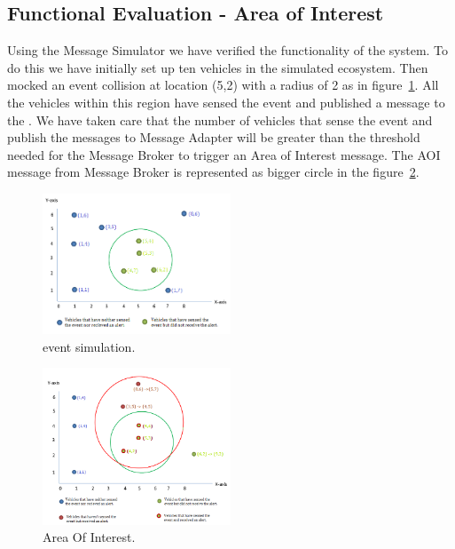 \subsection{Functional Evaluation - Area of Interest}
Using the Message Simulator we have verified the functionality of the
system.  To do this we have initially set up ten vehicles in the
simulated ecosystem.  Then mocked an event collision at location (5,2)
with a radius of 2 as in figure~\ref{fig:simulated}. All the vehicles
within this region have sensed the event and published a message to
the \name. We have taken care that the number of vehicles that sense
the event and publish the messages to Message Adapter will be greater
than the threshold needed for the Message Broker to trigger an Area of
Interest message. The AOI message from Message Broker is represented
as bigger circle in the figure~\ref{fig:aoi}.

\begin{figure}[ht]
  \begin{center}
    \includegraphics[width=0.5\textwidth]{figs/simulated.png}
    \caption{\name{} event simulation.}
    \label{fig:simulated}
  \end{center}
\end{figure}

\begin{figure}[ht]
  \begin{center}
    \includegraphics[width=0.5\textwidth]{figs/aoi.png}
    \caption{\name{} Area Of Interest.}
    \label{fig:aoi}
  \end{center}
\end{figure}

